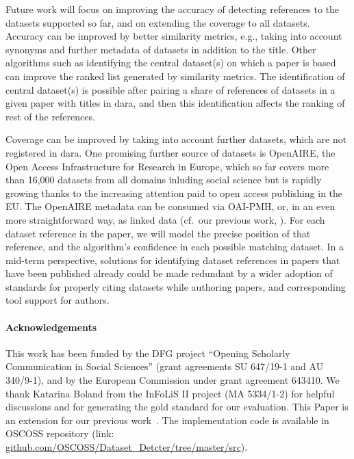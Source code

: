 \documentclass{IOS-Book-Article}
\newcommand{\dara}{\textsf{da\textbar ra}}
\begin{document}
Future work will focus on improving the accuracy of detecting references to the datasets supported so far, and on extending the coverage to all datasets.
Accuracy can be improved by better similarity metrics, e.g., taking into account synonyms and further metadata of datasets in addition to the title.
Other algorithms such as identifying the central dataset(s) on which a paper is based can improve the ranked list generated by similarity metrics.
The identification of central dataset(s) is possible after pairing a share of references of datasets in a given paper with titles in {\dara}, and then this identification affects the ranking of rest of the references. 

Coverage can be improved by 
taking into account further datasets, which are not registered in {\dara}.
One promising further source of datasets is OpenAIRE, the Open Access Infrastructure for Research in Europe, which so far covers more than 16,000 datasets from all domains inluding social science but is rapidly growing thanks to the increasing attention paid to open access publishing in the EU.
The OpenAIRE metadata can be consumed via OAI-PMH, or, in an even more straightforward way, as linked data (cf.\ our previous work, \citet{VahdatiEtAl:MappingResearchMetadata15}).
For each dataset reference in the paper, we will model the precise position of that reference, and the algorithm's confidence in each possible matching dataset.
In a mid-term perspective, solutions for identifying dataset references in papers that have been published already could be made redundant by a wider adoption of 
standards for properly citing datasets while authoring papers, and corresponding tool support for authors.

\paragraph{Acknowledgements}
This work has been funded by the DFG project “Opening Scholarly Communication in Social Sciences” 
(grant agreements SU 647/19-1 and AU 340/9-1), and by the European Commission under grant agreement 643410. 
We thank Katarina Boland from the InFoLiS II project (MA 5334/1-2) for helpful discussions and for generating the gold standard for our evaluation. 
This Paper is an extension for our previous work~\cite{ghavimi2016identifying}. The implementation code is available in OSCOSS repository (link: \url{github.com/OSCOSS/Dataset_Detcter/tree/master/src}). 

\end{document}
